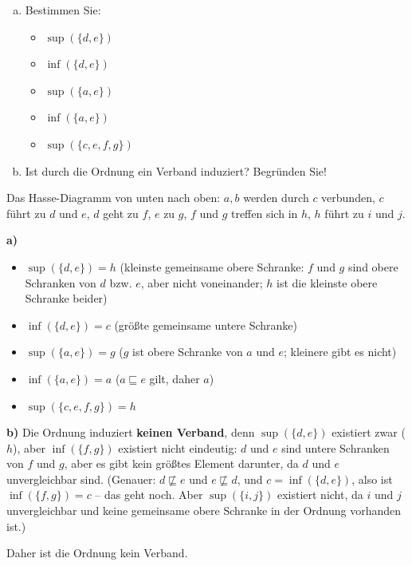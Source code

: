\begin{enumerate}[a)]
  \item Bestimmen Sie:
  \begin{itemize}
    \item $\sup(\{d, e\})$
    \item $\inf(\{d, e\})$
    \item $\sup(\{a, e\})$
    \item $\inf(\{a, e\})$
    \item $\sup(\{c, e, f, g\})$
  \end{itemize}
  \item Ist durch die Ordnung ein Verband induziert? Begründen Sie!
\end{enumerate}

\begin{loesung}
Das Hasse-Diagramm von unten nach oben: $a,b$ werden durch $c$ verbunden, $c$ führt zu $d$ und $e$, $d$ geht zu $f$, $e$ zu $g$, $f$ und $g$ treffen sich in $h$, $h$ führt zu $i$ und $j$.

\textbf{a)}
\begin{itemize}
  \item $\sup(\{d,e\}) = h$ \;(kleinste gemeinsame obere Schranke: $f$ und $g$ sind obere Schranken von $d$ bzw. $e$, aber nicht voneinander; $h$ ist die kleinste obere Schranke beider)
  \item $\inf(\{d,e\}) = c$ \;(größte gemeinsame untere Schranke)
  \item $\sup(\{a,e\}) = g$ \;($g$ ist obere Schranke von $a$ und $e$; kleinere gibt es nicht)
  \item $\inf(\{a,e\}) = a$ \;($a \sqsubseteq e$ gilt, daher $a$)
  \item $\sup(\{c,e,f,g\}) = h$
\end{itemize}

\textbf{b)} Die Ordnung induziert \textbf{keinen Verband}, denn $\sup(\{d,e\})$ existiert zwar ($h$), aber $\inf(\{f,g\})$ existiert nicht eindeutig: $d$ und $e$ sind untere Schranken von $f$ und $g$, aber es gibt kein größtes Element darunter, da $d$ und $e$ unvergleichbar sind. (Genauer: $d\not\sqsubseteq e$ und $e\not\sqsubseteq d$, und $c = \inf(\{d,e\})$, also ist $\inf(\{f,g\}) = c$ -- das geht noch. Aber $\sup(\{i,j\})$ existiert nicht, da $i$ und $j$ unvergleichbar und keine gemeinsame obere Schranke in der Ordnung vorhanden ist.)

Daher ist die Ordnung kein Verband.
\end{loesung}

